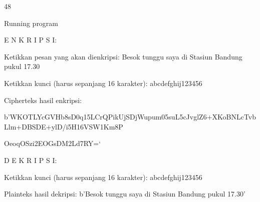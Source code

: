 \documentclass{article}
\begin{document}

48

Running program

E N K R I P S I:

Ketikkan pesan yang akan dienkripsi: Besok tunggu saya di Stasiun Bandung pukul 17.30

Ketikkan kunci (harus sepanjang 16 karakter): abcdefghij123456

Cipherteks hasil enkripsi:  

b'WKOTLYcGVHb8sD0q15LCrQPikUjSDjWupum05suL5cJvglZ6+XKoBNLcTvbLlm+DBSDE+ylD/i5H16VSW1Km8P

OeoqOSzi2EOGsDM2Ld7RY=‘

D E K R I P S I:

Ketikkan kunci (harus sepanjang 16 karakter): abcdefghij123456

Plainteks hasil dekripsi:  b'Besok tunggu saya di Stasiun Bandung pukul 17.30'
\end{document}
